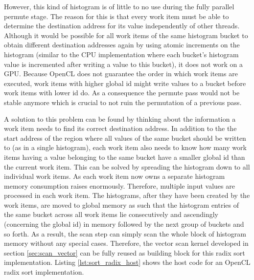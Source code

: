 However, this kind of histogram is of little to no use during the fully parallel permute stage. The reason for this is that every work item must be able to determine the destination address for its value independently of other threads. Although it would be possible for all work items of the same histogram bucket to obtain different destination addresses again by using atomic increments on the histogram (similar to the CPU implementation where each bucket's histogram value is incremented after writing a value to this bucket), it does not work on a GPU. Because OpenCL does not guarantee the order in which work items are executed, work items with higher global id might write values to a bucket before work items with lower id do. As a consequence the permute pass would not be stable anymore which is crucial to not ruin the permutation of a previous pass.

A solution to this problem can be found by thinking about the information a work item needs to find its correct destination address. In addition to the the start address of the region where all values of the same bucket should be written to (as in a single histogram), each work item also needs to know how many work items having a value belonging to the same bucket have a smaller global id than the current work item. This can be solved by spreading the histogram down to all individual work items. As each work item now owns a separate histogram memory consumption raises enormously. Therefore, multiple input values are processed in each work item. The histograms, after they have been created by the work items, are moved to global memory as such that the histogram entries of the same bucket across all work items lie consecutively and ascendingly (concerning the global id) in memory followed by the next group of buckets and so forth. As a result, the scan step can simply scan the whole block of histogram memory without any special cases. Therefore, the vector scan kernel developed in section \ref{sec:scan_vector} can be fully reused as building block for this radix sort implementation. 
Listing \ref{lst:sort_radix_host} shows the host code for an OpenCL radix sort implementation.



